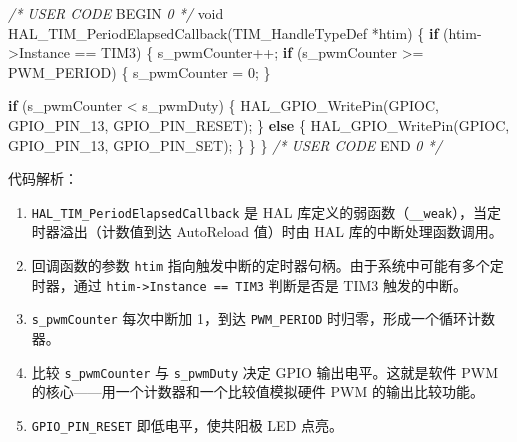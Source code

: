 \documentclass[
  chinese,
  UTF8,
  oneside,
  openany]{ctexbook}
\newenvironment{Shaded}{}{}
\newcommand{\CommentTok}[1]{\textcolor[rgb]{0.38,0.63,0.69}{\textit{#1}}}
\newcommand{\ControlFlowTok}[1]{\textcolor[rgb]{0.00,0.44,0.13}{\textbf{#1}}}
\newcommand{\DataTypeTok}[1]{\textcolor[rgb]{0.56,0.13,0.00}{#1}}
\newcommand{\DecValTok}[1]{\textcolor[rgb]{0.25,0.63,0.44}{#1}}
\newcommand{\NormalTok}[1]{#1}
\newcommand{\OperatorTok}[1]{\textcolor[rgb]{0.40,0.40,0.40}{#1}}
\newcommand{\RegionMarkerTok}[1]{#1}
\providecommand{\tightlist}{%
  \setlength{\itemsep}{0pt}\setlength{\parskip}{0pt}}
\begin{document}
\begin{Shaded}
\begin{Highlighting}[]
\CommentTok{/* USER CODE }\RegionMarkerTok{BEGIN}\CommentTok{ 0 */}
\DataTypeTok{void}\NormalTok{ HAL\_TIM\_PeriodElapsedCallback}\OperatorTok{(}\NormalTok{TIM\_HandleTypeDef }\OperatorTok{*}\NormalTok{htim}\OperatorTok{)}
\OperatorTok{\{}
    \ControlFlowTok{if} \OperatorTok{(}\NormalTok{htim}\OperatorTok{{-}\textgreater{}}\NormalTok{Instance }\OperatorTok{==}\NormalTok{ TIM3}\OperatorTok{)}
    \OperatorTok{\{}
\NormalTok{        s\_pwmCounter}\OperatorTok{++;}
        \ControlFlowTok{if} \OperatorTok{(}\NormalTok{s\_pwmCounter }\OperatorTok{\textgreater{}=}\NormalTok{ PWM\_PERIOD}\OperatorTok{)}
        \OperatorTok{\{}
\NormalTok{            s\_pwmCounter }\OperatorTok{=} \DecValTok{0}\OperatorTok{;}
        \OperatorTok{\}}

        \ControlFlowTok{if} \OperatorTok{(}\NormalTok{s\_pwmCounter }\OperatorTok{\textless{}}\NormalTok{ s\_pwmDuty}\OperatorTok{)}
        \OperatorTok{\{}
\NormalTok{            HAL\_GPIO\_WritePin}\OperatorTok{(}\NormalTok{GPIOC}\OperatorTok{,}\NormalTok{ GPIO\_PIN\_13}\OperatorTok{,}\NormalTok{ GPIO\_PIN\_RESET}\OperatorTok{);}
        \OperatorTok{\}}
        \ControlFlowTok{else}
        \OperatorTok{\{}
\NormalTok{            HAL\_GPIO\_WritePin}\OperatorTok{(}\NormalTok{GPIOC}\OperatorTok{,}\NormalTok{ GPIO\_PIN\_13}\OperatorTok{,}\NormalTok{ GPIO\_PIN\_SET}\OperatorTok{);}
        \OperatorTok{\}}
    \OperatorTok{\}}
\OperatorTok{\}}
\CommentTok{/* USER CODE }\RegionMarkerTok{END}\CommentTok{ 0 */}
\end{Highlighting}
\end{Shaded}

代码解析：

\begin{enumerate}
\def\labelenumi{\arabic{enumi}.}
\tightlist
\item
  \texttt{HAL\_TIM\_PeriodElapsedCallback} 是 HAL
  库定义的弱函数（\texttt{\_\_weak}），当定时器溢出（计数值到达
  AutoReload 值）时由 HAL 库的中断处理函数调用。
\item
  回调函数的参数 \texttt{htim}
  指向触发中断的定时器句柄。由于系统中可能有多个定时器，通过
  \texttt{htim-\textgreater{}Instance\ ==\ TIM3} 判断是否是 TIM3
  触发的中断。
\item
  \texttt{s\_pwmCounter} 每次中断加 1，到达 \texttt{PWM\_PERIOD}
  时归零，形成一个循环计数器。
\item
  比较 \texttt{s\_pwmCounter} 与 \texttt{s\_pwmDuty} 决定 GPIO
  输出电平。这就是软件 PWM 的核心------用一个计数器和一个比较值模拟硬件
  PWM 的输出比较功能。
\item
  \texttt{GPIO\_PIN\_RESET} 即低电平，使共阳极 LED 点亮。
\end{enumerate}
\end{document}
